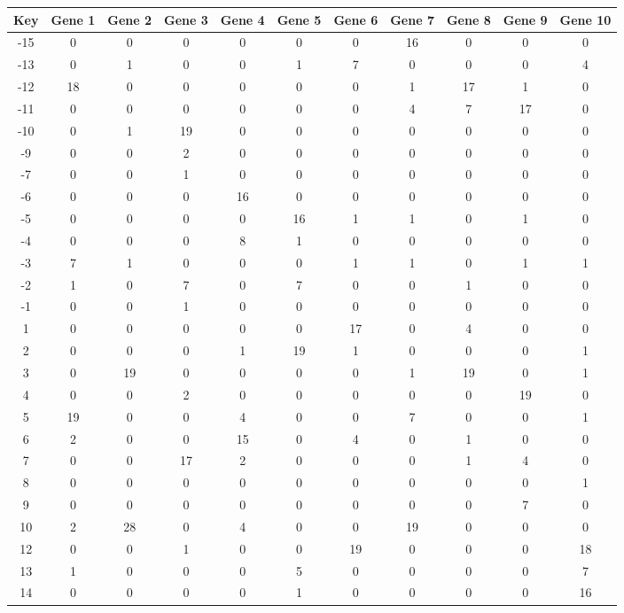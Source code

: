 \begin{tabular}{|c|c|c|c|c|c|c|c|c|c|c|}
\hline
Key & Gene 1 & Gene 2 & Gene 3 & Gene 4 & Gene 5 & Gene 6 & Gene 7 & Gene 8 & Gene 9 & Gene 10 \\
\hline
-15 & 0 & 0 & 0 & 0 & 0 & 0 & 16 & 0 & 0 & 0 \\
-13 & 0 & 1 & 0 & 0 & 1 & 7 & 0 & 0 & 0 & 4 \\
-12 & 18 & 0 & 0 & 0 & 0 & 0 & 1 & 17 & 1 & 0 \\
-11 & 0 & 0 & 0 & 0 & 0 & 0 & 4 & 7 & 17 & 0 \\
-10 & 0 & 1 & 19 & 0 & 0 & 0 & 0 & 0 & 0 & 0 \\
-9 & 0 & 0 & 2 & 0 & 0 & 0 & 0 & 0 & 0 & 0 \\
-7 & 0 & 0 & 1 & 0 & 0 & 0 & 0 & 0 & 0 & 0 \\
-6 & 0 & 0 & 0 & 16 & 0 & 0 & 0 & 0 & 0 & 0 \\
-5 & 0 & 0 & 0 & 0 & 16 & 1 & 1 & 0 & 1 & 0 \\
-4 & 0 & 0 & 0 & 8 & 1 & 0 & 0 & 0 & 0 & 0 \\
-3 & 7 & 1 & 0 & 0 & 0 & 1 & 1 & 0 & 1 & 1 \\
-2 & 1 & 0 & 7 & 0 & 7 & 0 & 0 & 1 & 0 & 0 \\
-1 & 0 & 0 & 1 & 0 & 0 & 0 & 0 & 0 & 0 & 0 \\
1 & 0 & 0 & 0 & 0 & 0 & 17 & 0 & 4 & 0 & 0 \\
2 & 0 & 0 & 0 & 1 & 19 & 1 & 0 & 0 & 0 & 1 \\
3 & 0 & 19 & 0 & 0 & 0 & 0 & 1 & 19 & 0 & 1 \\
4 & 0 & 0 & 2 & 0 & 0 & 0 & 0 & 0 & 19 & 0 \\
5 & 19 & 0 & 0 & 4 & 0 & 0 & 7 & 0 & 0 & 1 \\
6 & 2 & 0 & 0 & 15 & 0 & 4 & 0 & 1 & 0 & 0 \\
7 & 0 & 0 & 17 & 2 & 0 & 0 & 0 & 1 & 4 & 0 \\
8 & 0 & 0 & 0 & 0 & 0 & 0 & 0 & 0 & 0 & 1 \\
9 & 0 & 0 & 0 & 0 & 0 & 0 & 0 & 0 & 7 & 0 \\
10 & 2 & 28 & 0 & 4 & 0 & 0 & 19 & 0 & 0 & 0 \\
12 & 0 & 0 & 1 & 0 & 0 & 19 & 0 & 0 & 0 & 18 \\
13 & 1 & 0 & 0 & 0 & 5 & 0 & 0 & 0 & 0 & 7 \\
14 & 0 & 0 & 0 & 0 & 1 & 0 & 0 & 0 & 0 & 16 \\
\hline
\end{tabular}